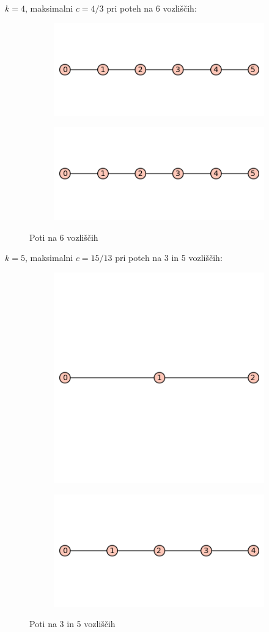 \documentclass[12pt, a4paper]{article}
\begin{document}
$k=4$, maksimalni $c=4/3$ pri poteh na 6 vozliščih:\\
\begin{center}
\begin{figure}[!htb]
\centering
\begin{subfigure}{0.5\textwidth}
  \centering
  \includegraphics[width=0.4\linewidth]{6-pot}
\end{subfigure}%
\begin{subfigure}{0.5\textwidth}
  \centering
  \includegraphics[width=0.5\linewidth]{6-pot}
\end{subfigure}
\caption{Poti na 6 vozliščih}
\label{fig:test}
\end{figure}

$k=5$, maksimalni $c=15/13$ pri poteh na 3 in 5 vozliščih:\\

\begin{center}
\begin{figure}[!htb]
\centering
\begin{subfigure}{0.5\textwidth}
  \centering
  \includegraphics[width=0.4\linewidth]{3-pot}
\end{subfigure}%
\begin{subfigure}{0.5\textwidth}
  \centering
  \includegraphics[width=0.5\linewidth]{5-pot}
\end{subfigure}
\caption{Poti na 3 in 5 vozliščih}
\label{fig:test}
\end{figure}


\end{center}
\end{center}
\end{document}
